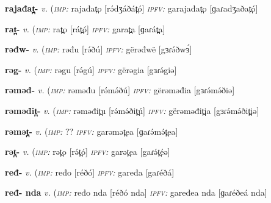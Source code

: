 {\newentry
\headword\textbf{rajađat̪-}  
\ipa{[ɾadʒaðat̪-]}
\synpos\textit{v.} 
\imperative(\textit {\textsc{imp:}} rajađat̪o [rə́dʒáðát̪ó] %
\imperfective\textit{\textsc{ipfv:}} garajađat̪o [ɡaɾadʒaðat̪ó] %

\newentry
\headword\textbf{rat̪-}  
\ipa{[ɾát̪-]}
\synpos\textit{v.} 
\imperative(\textit {\textsc{imp:}} rat̪o [rát̪ó]
\imperfective\textit{\textsc{ipfv:}} garat̪a [ɡaɾát̪a]

\newentry
\headword\textbf{rəđw-}  
\ipa{[ɾɘ́ðw-]}
\synpos\textit{v.} 
\imperative(\textit {\textsc{imp:}} rəđu [rə́ðú]
\imperfective\textit{\textsc{ipfv:}} gërəđwë [gɜɾə́ðwɜ́]

\newentry
\headword\textbf{rəg-}  
\ipa{[ɾɘ́g-]}
\synpos\textit{v.} 
\imperative(\textit {\textsc{imp:}} rəgu [rə́gú]
\imperfective\textit{\textsc{ipfv:}} gërəgia [gɜɾə́giə]

\newentry
\headword\textbf{rəməđ-}  
\ipa{[ɾɘ́mɘ́ð-]}
\synpos\textit{v.} 
\imperative(\textit {\textsc{imp:}} rəməđu [rə́mə́ðú]
\imperfective\textit{\textsc{ipfv:}} gërəməđia [gɜɾə́mə́ðiə]

\newentry
\headword\textbf{rəməđit̪-}  
\ipa{[ɾə́mə́ðit̪-]}
\synpos\textit{v.} 
\imperative(\textit {\textsc{imp:}} rəməđit̪u [rə́mə́ðit̪ú]
\imperfective\textit{\textsc{ipfv:}} gërəməđit̪ia [gɜɾə́mə́ðit̪iə]

\newentry
\headword\textbf{rəmət̪-}  
\ipa{[ɾə́mə́t̪-]}
\synpos\textit{v.} 
\imperative(\textit {\textsc{imp:}} ?? %
\imperfective\textit{\textsc{ipfv:}} garəmət̪ea [ɡaɾə́mə́t̪ea]


\newentry
\headword\textbf{rət̪-}  
\ipa{[ɾə́t̪-]}
\synpos\textit{v.} 
\imperative(\textit {\textsc{imp:}} rət̪o [rə́t̪ó]
\imperfective\textit{\textsc{ipfv:}} garət̪ea [gaɾə́t̪éə]


\newentry
\headword\textbf{ređ-}  
\ipa{[ɾéð-]}
\synpos\textit{v.} 
\imperative(\textit {\textsc{imp:}} ređo [réðó]
\imperfective\textit{\textsc{ipfv:}} gaređa [gaɾéðá]

\newentry
\headword\textbf{ređ- nda}  
\ipa{[ɾéð- nda]}
\synpos\textit{v.} 
\imperative(\textit {\textsc{imp:}} ređo nda [réðó nda]
\imperfective\textit{\textsc{ipfv:}} gaređea nda [ɡaɾéðeá nda]


}
